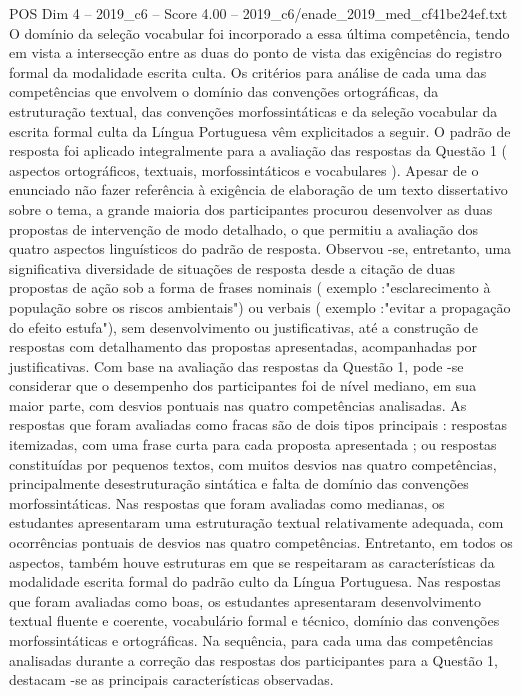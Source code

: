 \begin{textsample}{POS Dim 4 – 2019\_c6 – Score 4.00 – 2019\_c6/enade\_2019\_med\_cf41be24ef.txt}
O domínio da seleção vocabular foi incorporado a essa última competência, tendo em vista a intersecção entre as duas do ponto de vista das exigências do registro formal da modalidade escrita culta.
Os critérios para análise de cada uma das competências que envolvem o domínio das convenções ortográficas, da estruturação textual, das convenções morfossintáticas e da seleção vocabular da escrita formal culta da Língua Portuguesa vêm explicitados a seguir.
O padrão de resposta foi aplicado integralmente para a avaliação das respostas da Questão 1 ( aspectos ortográficos, textuais, morfossintáticos e vocabulares ).
Apesar de o enunciado não fazer referência à exigência de elaboração de um texto dissertativo sobre o tema, a grande maioria dos participantes procurou desenvolver as duas propostas de intervenção de modo detalhado, o que permitiu a avaliação dos quatro aspectos linguísticos do padrão de resposta.
Observou -se, entretanto, uma significativa diversidade de situações de resposta desde a citação de duas propostas de ação sob a forma de frases nominais ( exemplo :"esclarecimento à população sobre os riscos ambientais") ou verbais ( exemplo :"evitar a propagação do efeito estufa"), sem desenvolvimento ou justificativas, até a construção de respostas com detalhamento das propostas apresentadas, acompanhadas por justificativas.
Com base na avaliação das respostas da Questão 1, pode -se considerar que o desempenho dos participantes foi de nível mediano, em sua maior parte, com desvios pontuais nas quatro competências analisadas.
As respostas que foram avaliadas como fracas são de dois tipos principais : respostas itemizadas, com uma frase curta para cada proposta apresentada ; ou respostas constituídas por pequenos textos, com muitos desvios nas quatro competências, principalmente desestruturação sintática e falta de domínio das convenções morfossintáticas.
Nas respostas que foram avaliadas como medianas, os estudantes apresentaram uma estruturação textual relativamente adequada, com ocorrências pontuais de desvios nas quatro competências.
Entretanto, em todos os aspectos, também houve estruturas em que se respeitaram as características da modalidade escrita formal do padrão culto da Língua Portuguesa.
Nas respostas que foram avaliadas como boas, os estudantes apresentaram desenvolvimento textual fluente e coerente, vocabulário formal e técnico, domínio das convenções morfossintáticas e ortográficas.
Na sequência, para cada uma das competências analisadas durante a correção das respostas dos participantes para a Questão 1, destacam -se as principais características observadas.

\end{textsample}
